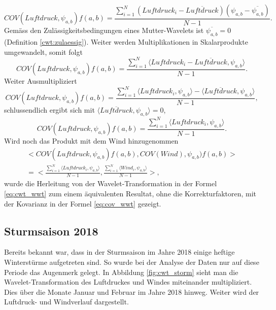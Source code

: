 \begin{refsection}
\begin{equation}
COV(Luftdruck, \psi_{a,b})f(a,b) = \frac{\sum_{i=1}^{N} (Luftdruck_i - \overline{Luftdruck})(\psi_{a,b}-  \overline{\psi_{a,b}})}{N-1}.
\end{equation}
Gemäss den Zulässigkeitsbedingungen eines Mutter-Wavelets ist $\overline{\psi_{a,b}} = 0$ (Definition \ref{cwt:zulaessig}). Weiter werden Multiplikationen in Skalarprodukte umgewandelt, somit folgt
\begin{equation}
COV(Luftdruck, \psi_{a,b})f(a,b) =  \frac{\sum_{i=1}^{N} 
 \langle Luftdruck_i- \overline{Luftdruck},\psi_{a,b}\rangle}{N-1}.
\end{equation}
Weiter Ausmultipliziert
\begin{equation}
COV(Luftdruck, \psi_{a,b})f(a,b) = \frac{\sum_{i=1}^{N} 
\langle Luftdruck_i,\psi_{a,b}\rangle - \langle \overline{Luftdruck},\psi_{a,b}\rangle}{N-1},
\end{equation}
schlussendlich ergibt sich mit $\langle \overline{Luftdruck},\psi_{a,b} \rangle = 0$,
\begin{equation}
COV(Luftdruck, \psi_{a,b})f(a,b) = \frac{\sum_{i=1}^{N} 
	\langle Luftdruck_i,\psi_{a,b}\rangle}{N-1}.
\end{equation}
 Wird noch das Produkt mit dem Wind hinzugenommen
 \begin{equation}
 \begin{split}
\biggl< COV(Luftdruck, \psi_{a,b})f(a,b), COV(Wind), \psi_{a,b})f(a,b) \biggr > \\
=
 \biggl< \frac{\sum_{i=1}^{N} 
 	\langle Luftdruck_i,\psi_{a,b}\rangle}{N-1},\frac{\sum_{i=1}^{N} 
 	\langle Wind_i,\psi_{a,b}\rangle}{N-1} \biggr >,
 \label{eq:cov_wwt}
 \end{split}
 \end{equation}
 wurde die Herleitung von der Wavelet-Transformation in der Formel \ref{eq:cwt_wwt} zum einem äquivalenten Resultat, ohne die Korrekturfaktoren, mit der Kovarianz in der Formel \ref{eq:cov_wwt} gezeigt.



\subsection{Sturmsaison 2018}
Bereits bekannt war, dass in der Sturmsaison im Jahre 2018 einige heftige Winterstürme aufgetreten sind.
So wurde bei der Analyse der Daten nur auf diese Periode das Augenmerk gelegt. 
In Abbildung \ref{fig:cwt_storm} \space sieht man die Wavelet-Transformation des Luftdruckes und Windes miteinander multipliziert.
Dies über die Monate Januar und Februar im Jahre 2018 hinweg.
Weiter wird der Luftdruck- und Windverlauf dargestellt.
 

\end{refsection}
